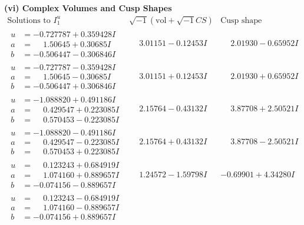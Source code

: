 \documentclass[1p]{elsarticle_modified}
\theoremstyle{definition}
\newcommand{\I}{\sqrt{-1}}
\begin{document}
\newpage\flushleft \textbf{(vi) Complex Volumes and Cusp Shapes}
$$\begin{array}{c|c|c}  
\text{Solutions to }I^u_{1}& \I (\text{vol} + \sqrt{-1}CS) & \text{Cusp shape}\\
 \hline 
\begin{aligned}
u &= -0.727787 + 0.359428 I \\
a &= \phantom{-}1.50645 + 0.30685 I \\
b &= -0.506447 - 0.306846 I\end{aligned}
 & \phantom{-}3.01151 - 0.12453 I & \phantom{-}2.01930 - 0.65952 I \\ \hline\begin{aligned}
u &= -0.727787 - 0.359428 I \\
a &= \phantom{-}1.50645 - 0.30685 I \\
b &= -0.506447 + 0.306846 I\end{aligned}
 & \phantom{-}3.01151 + 0.12453 I & \phantom{-}2.01930 + 0.65952 I \\ \hline\begin{aligned}
u &= -1.088820 + 0.491186 I \\
a &= \phantom{-}0.429547 + 0.223085 I \\
b &= \phantom{-}0.570453 - 0.223085 I\end{aligned}
 & \phantom{-}2.15764 - 0.43132 I & \phantom{-}3.87708 + 2.50521 I \\ \hline\begin{aligned}
u &= -1.088820 - 0.491186 I \\
a &= \phantom{-}0.429547 - 0.223085 I \\
b &= \phantom{-}0.570453 + 0.223085 I\end{aligned}
 & \phantom{-}2.15764 + 0.43132 I & \phantom{-}3.87708 - 2.50521 I \\ \hline\begin{aligned}
u &= \phantom{-}0.123243 + 0.684919 I \\
a &= \phantom{-}1.074160 + 0.889657 I \\
b &= -0.074156 - 0.889657 I\end{aligned}
 & \phantom{-}1.24572 - 1.59798 I & -0.69901 + 4.34280 I \\ \hline\begin{aligned}
u &= \phantom{-}0.123243 - 0.684919 I \\
a &= \phantom{-}1.074160 - 0.889657 I \\
b &= -0.074156 + 0.889657 I\end{aligned}

\end{array}$$
\end{document}
